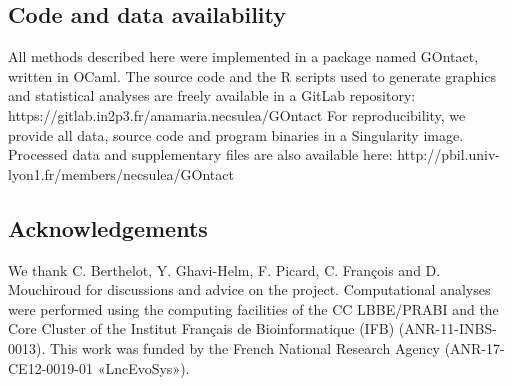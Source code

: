 \subsection{Code and data availability}
All methods described here were implemented in a package named GOntact, written in OCaml. The source code and the R scripts used to generate graphics and statistical analyses are freely available in a GitLab repository: 
https://gitlab.in2p3.fr/anamaria.necsulea/GOntact
For reproducibility, we provide all data, source code and program binaries in a Singularity image. Processed data and supplementary files are also available here:
http://pbil.univ-lyon1.fr/members/necsulea/GOntact 


\subsection{Acknowledgements}
We thank C. Berthelot, Y. Ghavi-Helm, F. Picard, C. François and D. Mouchiroud for discussions and advice on the project. Computational analyses were performed using the computing facilities of the CC LBBE/PRABI and the Core Cluster of the Institut Français de Bioinformatique (IFB) (ANR-11-INBS-0013). This work was funded by the French National Research Agency (ANR-17-CE12-0019-01 «LncEvoSys»). 

